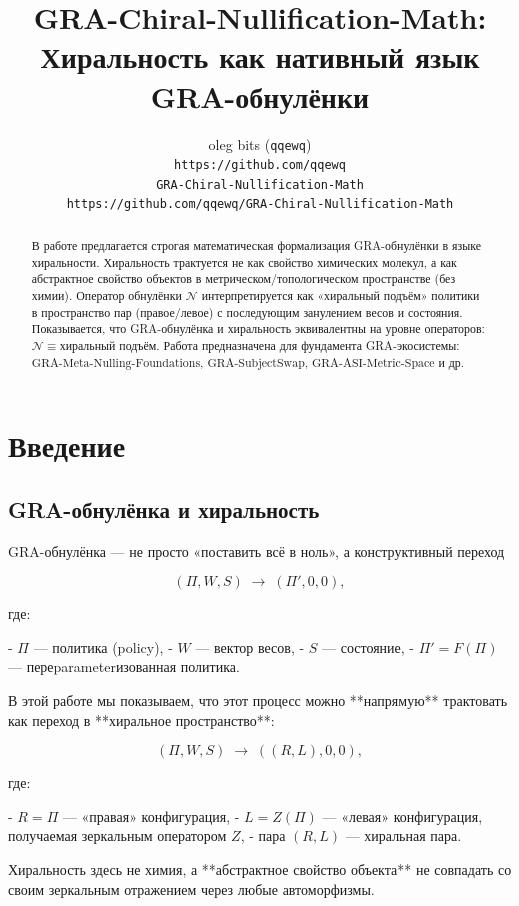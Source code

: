 \documentclass[11pt,a4paper]{article}
\title{
  \textbf{GRA-Chiral-Nullification-Math:} \\
  \textbf{Хиральность как нативный язык GRA-обнулёнки}
}
\author{
  oleg bits (\texttt{qqewq}) \\
  \texttt{https://github.com/qqewq} \\
  \texttt{GRA-Chiral-Nullification-Math} \\
  \texttt{https://github.com/qqewq/GRA-Chiral-Nullification-Math}
}
\date{}
\begin{document}
\maketitle

\begin{abstract}
В работе предлагается строгая математическая формализация GRA-обнулёнки в языке хиральности.
Хиральность трактуется не как свойство химических молекул, а как абстрактное свойство объектов в метрическом/топологическом пространстве (без химии).
Оператор обнулёнки \(\mathcal{N}\) интерпретируется как «хиральный подъём» политики в пространство пар (правое/левое) с последующим занулением весов и состояния.
Показывается, что GRA-обнулёнка и хиральность эквивалентны на уровне операторов: \( \mathcal{N} \equiv \text{хиральный подъём} \).
Работа предназначена для фундамента GRA-экосистемы: \( \text{GRA-Meta-Nulling-Foundations} \), \( \text{GRA-SubjectSwap} \), \( \text{GRA-ASI-Metric-Space} \) и др.
\end{abstract}

\section{Введение}

\subsection{GRA-обнулёнка и хиральность}

GRA-обнулёнка — не просто «поставить всё в ноль», а конструктивный переход

\[
(\Pi, W, S) \;\longrightarrow\; (\Pi', 0, 0),
\]

где:

- \(\Pi\) — политика (policy),
- \(W\) — вектор весов,
- \(S\) — состояние,
- \(\Pi' = F(\Pi)\) — переparameterизованная политика.

В этой работе мы показываем, что этот процесс можно **напрямую** трактовать как переход в **хиральное пространство**:

\[
(\Pi, W, S) \;\longrightarrow\; ((R, L), 0, 0),
\]

где:

- \(R = \Pi\) — «правая» конфигурация,
- \(L = Z(\Pi)\) — «левая» конфигурация, получаемая зеркальным оператором \(Z\),
- пара \((R, L)\) — хиральная пара.

Хиральность здесь не химия, а **абстрактное свойство объекта** не совпадать со своим зеркальным отражением через любые автоморфизмы.
\end{document}
